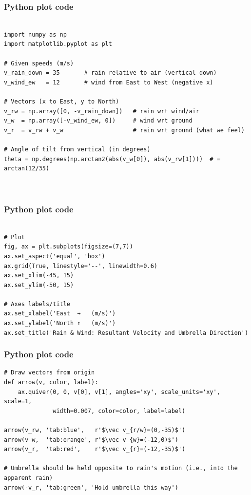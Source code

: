 \documentclass{beamer}
\begin{document}
\begin{frame}[fragile]
    \frametitle{Python plot code}
    \begin{lstlisting}
 
import numpy as np
import matplotlib.pyplot as plt

# Given speeds (m/s)
v_rain_down = 35       # rain relative to air (vertical down)
v_wind_ew   = 12       # wind from East to West (negative x)

# Vectors (x to East, y to North)
v_rw = np.array([0, -v_rain_down])   # rain wrt wind/air
v_w  = np.array([-v_wind_ew, 0])     # wind wrt ground
v_r  = v_rw + v_w                    # rain wrt ground (what we feel)

# Angle of tilt from vertical (in degrees)
theta = np.degrees(np.arctan2(abs(v_w[0]), abs(v_rw[1])))  # = arctan(12/35)

 
\end{lstlisting}
 
\end{frame}
\begin{frame}[fragile]
    \frametitle{Python plot code}
    \begin{lstlisting}
 
# Plot
fig, ax = plt.subplots(figsize=(7,7))
ax.set_aspect('equal', 'box')
ax.grid(True, linestyle='--', linewidth=0.6)
ax.set_xlim(-45, 15)
ax.set_ylim(-50, 15)

# Axes labels/title
ax.set_xlabel('East  →   (m/s)')
ax.set_ylabel('North ↑   (m/s)')
ax.set_title('Rain & Wind: Resultant Velocity and Umbrella Direction')
\end{lstlisting}
 
\end{frame}
\begin{frame}[fragile]
    \frametitle{Python plot code}
    \begin{lstlisting}
# Draw vectors from origin
def arrow(v, color, label):
    ax.quiver(0, 0, v[0], v[1], angles='xy', scale_units='xy', scale=1,
              width=0.007, color=color, label=label)

arrow(v_rw, 'tab:blue',   r'$\vec v_{r/w}=(0,-35)$')
arrow(v_w,  'tab:orange', r'$\vec v_{w}=(-12,0)$')
arrow(v_r,  'tab:red',    r'$\vec v_{r}=(-12,-35)$')

# Umbrella should be held opposite to rain's motion (i.e., into the apparent rain)
arrow(-v_r, 'tab:green', 'Hold umbrella this way')
\end{lstlisting}
 
\end{frame}
\end{document}
